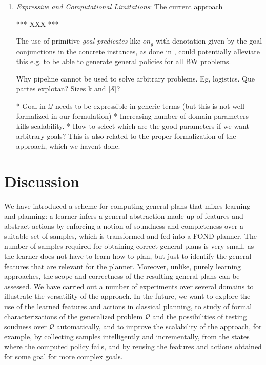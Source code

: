 \documentclass[letterpaper]{article} %
\newcommand{\Omit}[1]{}
\newcommand{\abs}[1]{\ensuremath{\left\vert{#1}\right\vert}}
\newcommand{\Q}{\mathcal{Q}}
\begin{document}
\begin{enumerate}
\item
\emph{Expressive and Computational Limitations}:
The current approach

*** XXX ***

The use of primitive \emph{goal predicates} like $on_g$ with denotation
given by the goal conjunctions in the concrete instances, as done in
\cite{martin-geffner:generalized}, could potentially alleviate this
e.g. to be able to generate general policies for all BW problems.


Why pipeline cannot be used to solve arbitrary problems. Eg, logistics.
Que partes explotan? Sizes k and $\abs{\mathcal{S}}$?

* Goal in $\Q$ needs to be expressible in generic terms (but this is not well formalized in our formulation)
* Increasing number of domain parameters kills scalability.
* How to select which are the good parameters if we want arbitrary goals? This is also related to the proper formalization
  of the approach, which we havent done.



\end{enumerate}


\section{Discussion}

We have introduced a scheme for computing general plans that mixes
learning and planning: a learner infers a general abstraction made
up of features and abstract actions by enforcing a notion of soundness
and completeness over a suitable set of samples, which is transformed
and fed into a FOND planner.
The number of samples required for obtaining correct general plans is
very small, as the learner does not have to learn how to plan, but
just to identify the general features that are relevant for the planner.
Moreover, unlike, purely learning approaches, the scope and correctness
of the resulting general plans can be assessed.
We have carried out a number of experiments over several domains to 
illustrate the versatility of the approach. In the future, we want to
explore the use of the learned features and actions in classical
planning, to study of formal characterizations of the generalized
problem $\Q$ and the possibilities of testing soudness over $\Q$
automatically, and to improve the scalability of the approach,
for example, by collecting samples intelligently and incrementally,
from the states where the computed policy fails, and by reusing the
features and actions obtained for some goal for more complex goals.

\Omit{
** discussion  of experiments; things we do well and not, scope, lessons. limitations (expressive? scalability?)
** briefly related work, expanding paragraph in intro.
** summary and cconlusions
}



\end{document}
